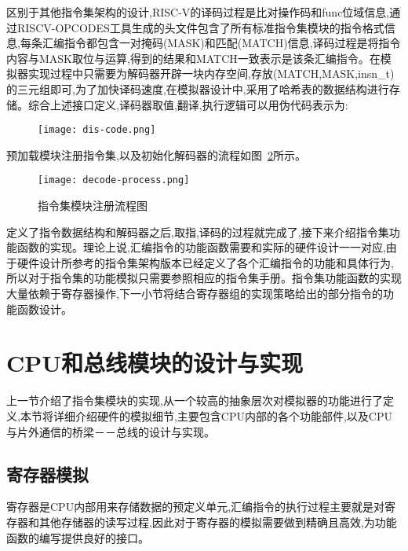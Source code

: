 区别于其他指令集架构的设计,RISC-V的译码过程是比对操作码和func位域信息,通过RISCV-OPCODES工具生成的头文件包含了所有标准指令集模块的指令格式信息,每条汇编指令都包含一对掩码(MASK)和匹配(MATCH)信息,译码过程是将指令内容与MASK取位与运算,得到的结果和MATCH一致表示是该条汇编指令。在模拟器实现过程中只需要为解码器开辟一块内存空间,存放(MATCH,MASK,insn\_t)的三元组即可,为了加快译码速度,在模拟器设计中,采用了哈希表的数据结构进行存储。综合上述接口定义,译码器取值,翻译,执行逻辑可以用伪代码表示为:
\begin{figure}[H]
    \centering
    \texttt{[image: dis-code.png]}
    \label{fig:dis-code}
\end{figure}
\vspace{-0.8cm} 
预加载模块注册指令集,以及初始化解码器的流程如图~\ref{fig:decode-process}所示。
\begin{figure}[H]
  \centering
  \texttt{[image: decode-process.png]}
  \caption{指令集模块注册流程图}
  \label{fig:decode-process}
\end{figure}


定义了指令数据结构和解码器之后,取指,译码的过程就完成了,接下来介绍指令集功能函数的实现。理论上说,汇编指令的功能函数需要和实际的硬件设计一一对应,由于硬件设计所参考的指令集架构版本已经定义了各个汇编指令的功能和具体行为,所以对于指令集的功能模拟只需要参照相应的指令集手册。指令集功能函数的实现大量依赖于寄存器操作,下一小节将结合寄存器组的实现策略给出的部分指令的功能函数设计。


\section{CPU和总线模块的设计与实现}

上一节介绍了指令集模块的实现,从一个较高的抽象层次对模拟器的功能进行了定义,本节将详细介绍硬件的模拟细节,主要包含CPU内部的各个功能部件,以及CPU与片外通信的桥梁－－总线的设计与实现。


\subsection{寄存器模拟}

寄存器是CPU内部用来存储数据的预定义单元,汇编指令的执行过程主要就是对寄存器和其他存储器的读写过程,因此对于寄存器的模拟需要做到精确且高效,为功能函数的编写提供良好的接口。


